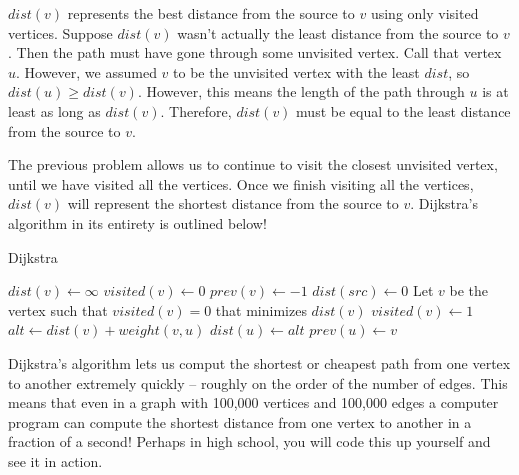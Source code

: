\documentclass[11pt]{article}
\begin{document}
\begin{solution}
$dist(v)$ represents the best distance from the source to $v$ using only visited vertices. Suppose $dist(v)$ wasn't actually the least
distance from the source to $v$. Then the path must have gone through some unvisited vertex. Call that vertex $u$. However, we assumed $v$ to be the unvisited vertex
with the least $dist$, so $dist(u) \ge dist(v)$. However, this means the length of the path through $u$ is at least as long as $dist(v)$.
Therefore, $dist(v)$ must be equal to the least distance from the source to $v$.
\end{solution}

The previous problem allows us to continue to visit the closest unvisited vertex, until we have visited all the vertices. Once we finish visiting all the vertices,
$dist(v)$ will represent the shortest distance from the source to $v$. Dijkstra's algorithm in its entirety is outlined below!

\begin{algorithm}[H]
\caption{Dijkstra}
\begin{algorithmic}
	\State $dist(v) \gets \infty$ 
	\State $visited(v) \gets 0$ 
    \State $prev(v) \gets -1$ 
\EndFor
\State $dist(src) \gets 0$ 
	\State Let $v$ be the vertex such that $visited(v)=0$ that minimizes $dist(v)$
    \State $visited(v) \gets 1$ 
    		\State $alt \gets dist(v) + weight(v, u)$
				\State $dist(u) \gets alt$ 
   	        	\State $prev(u) \gets v$
			\EndIf
        \EndIf
    \EndFor
\EndWhile
\end{algorithmic}
\end{algorithm}

Dijkstra's algorithm lets us comput the shortest or cheapest path from one vertex to another extremely quickly -- roughly on the order of the number of edges.
This means that even in a graph with 100,000 vertices and 100,000 edges a computer program can compute the shortest distance from one vertex to another in a fraction of 
a second! Perhaps in high school, you will code this up yourself and see it in action.
\end{document}
